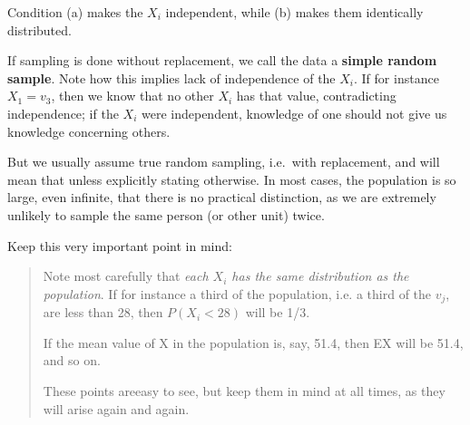 Condition (a) makes the $X_i$ independent, while (b) makes them
identically distributed.

If sampling is done without replacement, we call the data a {\bf simple
random sample}.  Note how this implies lack of independence of the
$X_i$.  If for instance $X_1 = v_3$, then we know that no other $X_i$
has that value, contradicting independence; if the $X_i$ were
independent, knowledge of one should not give us knowledge concerning
others.

But we usually assume true random sampling, i.e.\ with replacement, and
will mean that unless explicitly stating otherwise.  In most cases, the
population is so large, even infinite, that there is no practical
distinction, as we are extremely unlikely to sample the same person (or
other unit) twice.

Keep this very important point in mind:

\begin{quote}

Note most carefully that {\it each $X_i$ has the same distribution as
the population}.  If for instance a third of the population, i.e. a
third of the $v_j$, are less than 28, then $P(X_i < 28)$ will be 1/3.

If the mean value of X in the population is, say, 51.4, then EX will
be 51.4, and so on.

These points areeasy to see, but keep them in mind at all times, as
they will arise again and again.

\end{quote}

% 

